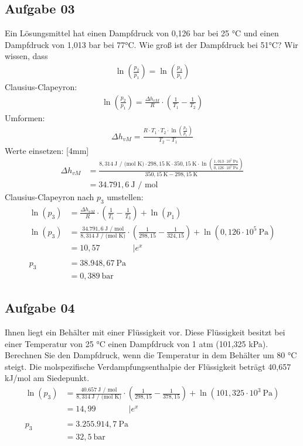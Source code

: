 \documentclass[a4paper,10pt]{article}
\begin{document}
\pagebreak
\subsection*{Aufgabe 03}
Ein Lösungsmittel hat einen Dampfdruck von 0,126 bar bei 25 °C und einen Dampfdruck von
1,013 bar bei 77°C. Wie groß ist der Dampfdruck bei 51°C?
\pp
Wir wissen, dass
\begin{align*}
\ln(\frac{p_2}{p_1}) = \ln(\frac{p_3}{p_1})
\end{align*}
Clausius-Clapeyron:
\begin{align*}
\ln(\frac{p_2}{p_1}) = \frac{\Delta h_{vM}}{R} \cdot \left( \frac{1}{T_1} - \frac{1}{T_2} \right)
\end{align*}
Umformen:
\begin{align*}
\Delta h_{vM} = \frac{R \cdot T_1 \cdot T_2 \cdot \ln(\frac{p_2}{p_1})}{T_2 - T_1}
\end{align*}
Werte einsetzen:
[4mm]
\begin{align*}
\Delta h_{vM} &= \frac{8,314 ~\text{J / (mol K)} \cdot 298,15 ~\text{K} \cdot 350,15 ~\text{K} \cdot \ln(\frac{1,013 \cdot 10^5 ~\text{Pa}}{0,126 \cdot 10^5 ~\text{Pa}})}{350,15 ~\text{K} - 298,15 ~\text{K}} \\
 &= 34.791,6 ~\text{J / mol}
\end{align*}
Clausius-Clapeyron nach $p_3$ umstellen:
\begin{align*}
\ln(p_3) &= \frac{\Delta h_{vM}}{R} \cdot \left( \frac{1}{T_1} - \frac{1}{T_3} \right) + \ln(p_1) \\
\ln(p_3) &= \frac{34.791,6 ~\text{J / mol}}{8,314 ~\text{J / (mol K)}} \cdot \left( \frac{1}{298,15} - \frac{1}{324,15} \right) + \ln(0,126 \cdot 10^5 ~\text{Pa}) \\
&= 10,57 \qquad \qquad| e^x \\ \\
p_3 &= 38.948,67 ~\text{Pa} \\
&= 0,389 ~\text{bar}
\end{align*}





\subsection*{Aufgabe 04}
Ihnen liegt ein Behälter mit einer Flüssigkeit vor. Diese Flüssigkeit besitzt bei einer
Temperatur von 25 °C einen Dampfdruck von 1 atm (101,325 kPa). Berechnen Sie den
Dampfdruck, wenn die Temperatur in dem Behälter um 80 °C steigt. Die molspezifische
Verdampfungsenthalpie der Flüssigkeit beträgt 40,657 kJ/mol am Siedepunkt. 
\begin{align*}
\ln(p_3) &= \frac{40.657 ~\text{J / mol}}{8,314 ~\text{J / (mol K)}} \cdot \left( \frac{1}{298,15} - \frac{1}{378,15} \right) + \ln(101,325 \cdot 10^3 ~\text{Pa}) \\
&= 14,99 \qquad \qquad| e^x \\ \\
p_3 &= 3.255.914,7 ~\text{Pa} \\
&= 32,5 ~\text{bar}
\end{align*}
\end{document}
